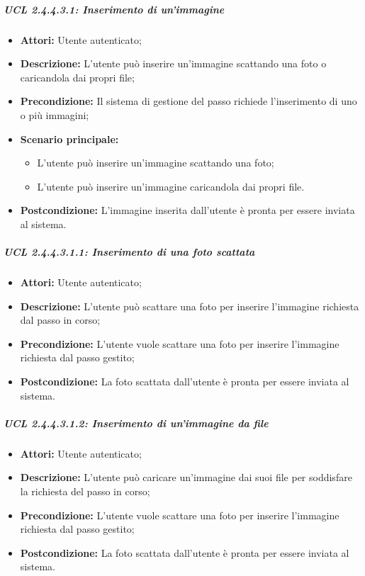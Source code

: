 \subparagraph{UCL 2.4.4.3.1: Inserimento di un'immagine}
\begin{itemize}
\item \textbf{Attori:} Utente autenticato;
\item \textbf{Descrizione:} L'utente può inserire un'immagine scattando una foto o caricandola dai propri file;
\item \textbf{Precondizione:} Il sistema di gestione del passo richiede l'inserimento di uno o più immagini;
\item \textbf{Scenario principale:}
\begin{itemize}
\item L'utente può inserire un'immagine scattando una foto;
\item L'utente può inserire un'immagine caricandola dai propri file.
\end{itemize}
\item \textbf{Postcondizione:} L'immagine inserita dall'utente è pronta per essere inviata al sistema.
\end{itemize}

\subparagraph{UCL 2.4.4.3.1.1: Inserimento di una foto scattata}
\begin{itemize}
\item \textbf{Attori:} Utente autenticato;
\item \textbf{Descrizione:} L'utente può scattare una foto per inserire l'immagine richiesta dal passo in corso;
\item \textbf{Precondizione:} L'utente vuole scattare una foto per inserire l'immagine richiesta dal passo gestito;
\item \textbf{Postcondizione:} La foto scattata dall'utente è pronta per essere inviata al sistema.
\end{itemize}

\subparagraph{UCL 2.4.4.3.1.2: Inserimento di un'immagine da file}
\begin{itemize}
\item \textbf{Attori:} Utente autenticato;
\item \textbf{Descrizione:} L'utente può caricare un'immagine dai suoi file per soddisfare la richiesta del passo in corso;
\item \textbf{Precondizione:} L'utente vuole scattare una foto per inserire l'immagine richiesta dal passo gestito;
\item \textbf{Postcondizione:} La foto scattata dall'utente è pronta per essere inviata al sistema.
\end{itemize}


